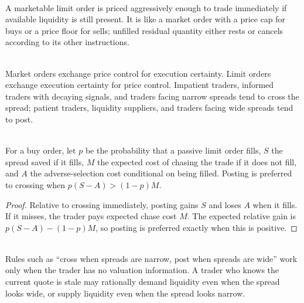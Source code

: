 \documentclass[a4paper,oneside,openany]{book}
\begin{document}
\begin{definition} \\
A marketable limit order is priced aggressively enough to trade immediately if available liquidity is still present. It is like a market order with a price cap for buys or a price floor for sells; unfilled residual quantity either rests or cancels according to its other instructions.
\end{definition}

\begin{principle} \\
Market orders exchange price control for execution certainty. Limit orders exchange execution certainty for price control. Impatient traders, informed traders with decaying signals, and traders facing narrow spreads tend to cross the spread; patient traders, liquidity suppliers, and traders facing wide spreads tend to post.
\end{principle}

\begin{proposition} \\
For a buy order, let $p$ be the probability that a passive limit order fills, $S$ the spread saved if it fills, $M$ the expected cost of chasing the trade if it does not fill, and $A$ the adverse-selection cost conditional on being filled. Posting is preferred to crossing when $p(S-A)>(1-p)M$.
\begin{proof}
Relative to crossing immediately, posting gains $S$ and loses $A$ when it fills.\\
If it misses, the trader pays expected chase cost $M$. The expected relative gain is $p(S-A)-(1-p)M$, so posting is preferred exactly when this is positive.
\end{proof}
\end{proposition}

\begin{caveat} \\
Rules such as ``cross when spreads are narrow, post when spreads are wide'' work only when the trader has no valuation information. A trader who knows the current quote is stale may rationally demand liquidity even when the spread looks wide, or supply liquidity even when the spread looks narrow.
\end{caveat}
\end{document}
